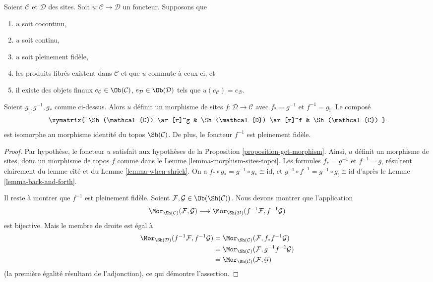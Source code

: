 \begin{lemma}
\label{lemma-bigger-site}
Soient $\mathcal{C}$ et $\mathcal{D}$ des sites.
Soit $u : \mathcal{C} \to \mathcal{D}$ un foncteur.
Supposons que
\begin{enumerate}
\item[(a)] $u$ soit cocontinu,
\item[(b)] $u$ soit continu,
\item[(c)] $u$ soit pleinement fidèle,
\item[(d)] les produits fibrés existent dans $\mathcal{C}$ et que $u$ commute
à ceux-ci, et
\item[(e)] il existe des objets finaux
$e_\mathcal{C} \in \Ob(\mathcal{C})$,
$e_\mathcal{D} \in \Ob(\mathcal{D})$ tels que
$u(e_\mathcal{C}) = e_\mathcal{D}$.
\end{enumerate}
Soient $g_!, g^{-1}, g_*$ comme ci-dessus. Alors $u$ définit un morphisme de
sites $f : \mathcal{D} \to \mathcal{C}$ avec $f_* = g^{-1}$ et
$f^{-1} = g_!$. Le composé
$$
\xymatrix{
\Sh(\mathcal{C}) \ar[r]^g &
\Sh(\mathcal{D}) \ar[r]^f &
\Sh(\mathcal{C})
}
$$
est isomorphe au morphisme identité du topos $\Sh(\mathcal{C})$. De plus, le
foncteur $f^{-1}$ est pleinement fidèle.
\end{lemma}

\begin{proof}
Par hypothèse, le foncteur $u$ satisfait aux hypothèses de la
Proposition \ref{proposition-get-morphism}. Ainsi, $u$ définit un morphisme de
sites, donc un morphisme de topos $f$ comme dans le
Lemme \ref{lemma-morphism-sites-topoi}. Les formules $f_* = g^{-1}$ et
$f^{-1} = g_!$ résultent clairement du lemme cité et du
Lemme \ref{lemma-when-shriek}.
On a
$f_* \circ g_* = g^{-1} \circ g_* \cong \text{id}$, et
$g^{-1} \circ f^{-1} = g^{-1} \circ g_! \cong \text{id}$
d’après le Lemme \ref{lemma-back-and-forth}.

\medskip\noindent
Il reste à montrer que $f^{-1}$ est pleinement fidèle.
Soient $\mathcal{F}, \mathcal{G} \in \Ob(\Sh(\mathcal{C}))$.
Nous devons montrer que l’application
$$
\Mor_{\Sh(\mathcal{C})}(\mathcal{F}, \mathcal{G})
\longrightarrow
\Mor_{\Sh(\mathcal{D})}(f^{-1}\mathcal{F}, f^{-1}\mathcal{G})
$$
est bijective. Mais le membre de droite est égal à
\begin{align*}
\Mor_{\Sh(\mathcal{D})}(f^{-1}\mathcal{F}, f^{-1}\mathcal{G})
& =
\Mor_{\Sh(\mathcal{C})}(\mathcal{F}, f_*f^{-1}\mathcal{G}) \\
& =
\Mor_{\Sh(\mathcal{C})}(\mathcal{F}, g^{-1}f^{-1}\mathcal{G}) \\
& =
\Mor_{\Sh(\mathcal{C})}(\mathcal{F}, \mathcal{G})
\end{align*}
(la première égalité résultant de l’adjonction), ce qui démontre l’assertion.
\end{proof}

